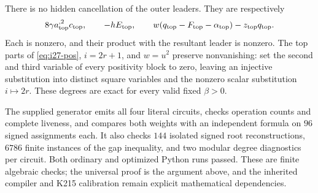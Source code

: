 There is no hidden cancellation of the outer leaders. They are respectively
\[
 8\gamma a_{\rm top}^{,2}c_{\rm top},\qquad
 -hE_{\rm top},\qquad
 w(q_{\rm top}-F_{\rm top}-\alpha_{\rm top})-z_{\rm top}q_{\rm top}.
\]
Each is nonzero, and their product with the resultant leader is nonzero.
The top parts of \eqref{eq:i27-pos}, $i=2r+1$, and $w=u^2$ preserve
nonvanishing: set the second and third variable of every positivity block
to zero, leaving an injective substitution into distinct square variables
and the nonzero scalar substitution $i\mapsto2r$. These degrees are exact
for every valid fixed $\beta>0$.

The supplied generator emits all four literal circuits, checks operation
counts and complete liveness, and compares both weights with an independent
formula on $96$ signed assignments each. It also checks $144$ isolated
signed root reconstructions, $6786$ finite instances of the gap inequality,
and two modular degree diagnostics per circuit. Both ordinary and optimized
Python runs passed. These are finite algebraic checks; the universal proof
is the argument above, and the inherited compiler and K215 calibration
remain explicit mathematical dependencies.
